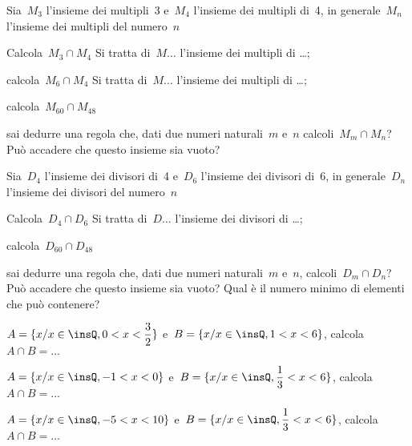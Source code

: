 \begin{esercizio}
\label{ese:7.46}
Sia~\(M_{3}\) l'insieme dei multipli~3 e~\(M_{4}\) l'insieme dei multipli di~4, in
generale~\(M_{n}\) l'insieme dei multipli del numero~\(n\)
\vspace{-6pt}
 \begin{enumeratea}
 \item Calcola~\(M_{3}\cap M_{4}\) Si tratta di~\(M\ldots\) l'insieme dei multipli 
di \ldots;
 \item calcola~\(M_{6}\cap M_{4}\) Si tratta di~\(M\ldots\) l'insieme dei multipli 
di \ldots;
 \item calcola~\(M_{60}\cap M_{48}\)
 \item sai dedurre una regola che, dati due numeri naturali~\(m\) e~\(n\) 
calcoli~\(M_{m}\cap M_{n}\)? Può accadere che questo insieme sia vuoto?
 \end{enumeratea}
\end{esercizio}


\begin{esercizio}
\label{ese:7.47}
Sia~\(D_{4}\) l'insieme dei divisori di~4 e~\(D_{6}\) l'insieme dei divisori di~6, 
in generale~\(D_{n}\) l'insieme dei divisori del numero~\(n\)
\vspace{-6pt}
\begin{enumeratea}
 \item Calcola~\(D_{4}\cap D_{6}\) Si tratta di~\(D\ldots\) l'insieme dei divisori 
di \ldots;
 \item calcola~\(D_{60}\cap D_{48}\)
 \item sai dedurre una regola che, dati due numeri naturali~\(m\) e~\(n\),
calcoli~\(D_{m}\cap D_{n}\)? Può accadere che questo insieme sia
vuoto? Qual è il numero minimo di elementi che può contenere?
\end{enumeratea}
\end{esercizio}

\begin{esercizio}
\label{ese:7.48}
\(A=\{x/x\in \insQ,0<x<\dfrac{3}{2}\}\) e~\(B=\{x/x\in \insQ,1<x<6\}\), 
calcola~\(A\cap B=\ldots\)
\end{esercizio}

\begin{esercizio}
\label{ese:7.49}
\(A=\{x/x\in \insQ,-1<x<0\}\) e~\(B=\{x/x\in \insQ,\dfrac{1}{3}<x<6\}\), 
calcola~\(A\cap B=\ldots\)
\end{esercizio}

\begin{esercizio}
\label{ese:7.50}
\(A=\{x/x\in \insQ,-5<x<10\}\) e~\(B=\{x/x\in \insQ,\dfrac{1}{3}<x<6\}\), 
calcola~\(A\cap B=\ldots\)
\end{esercizio}


